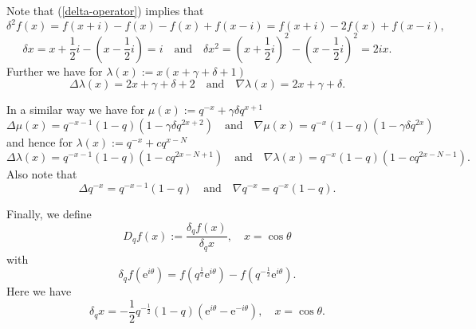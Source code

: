 \documentclass[envcountchap,graybox]{svmono}
\newcommand{\e}{\textrm{e}}
\begin{document}
Note that (\ref{delta-operator}) implies that
$$\delta^2 f(x)=f(x+i)-f(x)-f(x)+f(x-i)=f(x+i)-2f(x)+f(x-i),$$
$$\delta x=x+\textstyle\frac{1}{2}i-(x-\textstyle\frac{1}{2}i)=i
\quad\textrm{and}\quad
\delta x^2=(x+\textstyle\frac{1}{2}i)^2-(x-\textstyle\frac{1}{2}i)^2=2ix.$$
Further we have for $\lambda(x):=x(x+\gamma+\delta+1)$
$$\Delta\lambda(x)=2x+\gamma+\delta+2\quad\textrm{and}\quad\nabla\lambda(x)=2x+\gamma+\delta.$$

In a similar way we have for $\mu(x):=q^{-x}+\gamma\delta q^{x+1}$
$$\Delta\mu(x)=q^{-x-1}(1-q)(1-\gamma\delta q^{2x+2})\quad\textrm{and}\quad
\nabla\mu(x)=q^{-x}(1-q)(1-\gamma\delta q^{2x})$$
and hence for $\lambda(x):=q^{-x}+cq^{x-N}$
$$\Delta\lambda(x)=q^{-x-1}(1-q)(1-cq^{2x-N+1})\quad\textrm{and}\quad
\nabla\lambda(x)=q^{-x}(1-q)(1-cq^{2x-N-1}).$$
Also note that
$$\Delta q^{-x}=q^{-x-1}(1-q)\quad\textrm{and}\quad\nabla q^{-x}=q^{-x}(1-q).$$

Finally, we define
\begin{equation}
\label{Dq-operator}
D_qf(x):=\frac{\delta_qf(x)}{\delta_qx}, \quad x=\cos\theta
\end{equation}
with
$$\delta_qf(\e^{i\theta})
=f(q^{\frac{1}{2}}\e^{i\theta})-f(q^{-\frac{1}{2}}\e^{i\theta}).$$
Here we have
$$\delta_qx=-\textstyle\frac{1}{2}q^{-\frac{1}{2}}(1-q)(\e^{i\theta}-\e^{-i\theta}),
\quad x=\cos\theta.$$
\end{document}
